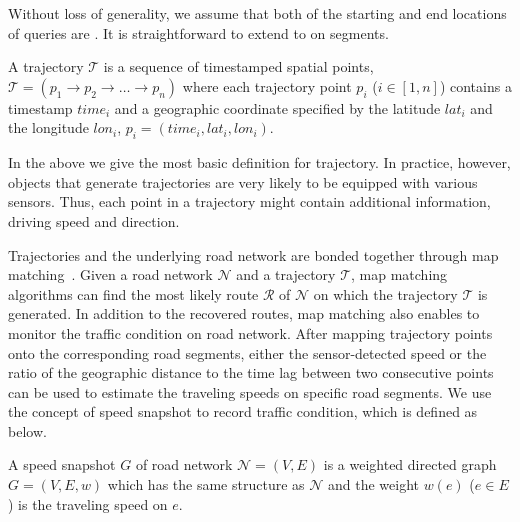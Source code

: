 Without loss of generality, we assume that both of the starting and end locations of queries are . It is straightforward to extend to on segments.

\begin{definition}[Trajectory]A trajectory $\mathcal{T}$ is a sequence of timestamped spatial points, $\mathcal{T} = (p_1 \rightarrow p_2 \rightarrow \dots \rightarrow p_n)$ where each trajectory point $p_i$ ($i\in[1,n]$) contains a timestamp $time_i$ and a geographic coordinate specified by the latitude $lat_i$ and the longitude $lon_i$, \ie $p_i=(time_i,lat_i,lon_i)$.
\end{definition}

In the above we give the most basic definition for trajectory. In practice, however, objects that generate trajectories are very likely to be equipped with various sensors. Thus, each point in a trajectory might contain additional information, \eg driving speed and direction.



Trajectories and the underlying road network are bonded together through map matching~\cite{Newson2009MM,WuMSZZCWKDD16}. Given a road network $\mathcal{N}$ and a trajectory $\mathcal{T}$, map matching algorithms can find the most likely route $\mathcal{R}$ of $\mathcal{N}$ on which the trajectory $\mathcal{T}$ is generated.
In addition to the recovered routes, map matching also enables to monitor the traffic condition on road network. After mapping trajectory points onto the corresponding road segments, either the sensor-detected speed or the ratio of the geographic distance to the time lag between two consecutive points can be used to estimate the traveling speeds on specific road segments.
We use the concept of speed snapshot to record traffic condition, which is defined as below.

\begin{definition}A speed snapshot $G$ of road network $\mathcal{N}=(V, E)$ is a weighted directed graph $G=(V,E,w)$ which has the same structure as $\mathcal{N}$ and the weight $w(e)$ ($e\in E$) is the traveling speed on $e$.
\end{definition}

